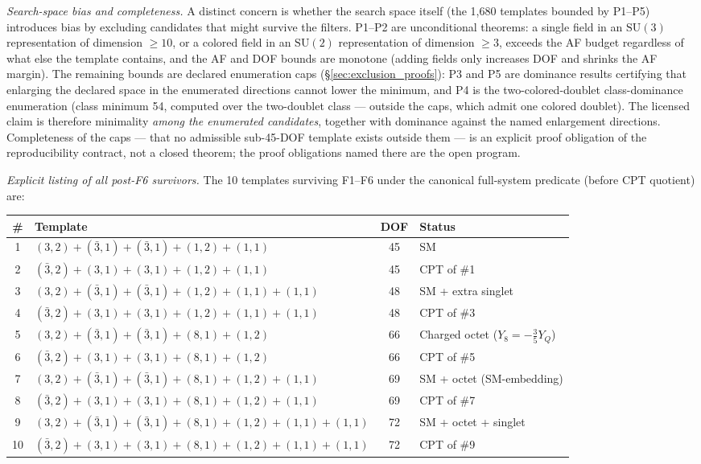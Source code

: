 \documentclass[11pt]{article}
\theoremstyle{definition}
\newcommand{\SU}{\mathrm{SU}}
\begin{document}
\smallskip\noindent\textit{Search-space bias and completeness.}\quad
A distinct concern is whether the search space itself (the 1{,}680
templates bounded by P1--P5) introduces bias by excluding candidates
that might survive the filters.  P1--P2 are unconditional theorems: a
single field in an $\SU(3)$ representation of dimension $\ge 10$, or a
colored field in an $\SU(2)$ representation of dimension $\ge 3$,
exceeds the AF budget regardless of what else the template contains,
and the AF and DOF bounds are monotone (adding fields only increases
DOF and shrinks the AF margin).  The remaining bounds are declared
enumeration caps (\S\ref{sec:exclusion_proofs}): P3 and P5 are
dominance results certifying that enlarging the declared space in the
enumerated directions cannot lower the minimum, and P4 is the
two-colored-doublet class-dominance enumeration (class minimum 54,
computed over the two-doublet class --- outside the caps, which admit
one colored doublet).  The licensed claim is
therefore minimality \emph{among the enumerated candidates}, together
with dominance against the named enlargement directions.  Completeness
of the caps --- that no admissible sub-45-DOF template exists outside
them --- is an explicit proof obligation of the reproducibility
contract, not a closed theorem; the proof obligations named there are
the open program.

\smallskip\noindent\textit{Explicit listing of all post-F6 survivors.}\quad
The 10 templates surviving F1--F6 under the canonical full-system
predicate (before CPT quotient) are:

\smallskip
\begin{center}\small
\renewcommand{\arraystretch}{1.15}
\begin{tabular}{@{}clcl@{}}
\toprule
\# & Template & DOF & Status \\
\midrule
1 & $(3,2) + (\bar{3},1) + (\bar{3},1) + (1,2) + (1,1)$ & 45 & SM \\
2 & $(\bar{3},2) + (3,1) + (3,1) + (1,2) + (1,1)$ & 45 & CPT of \#1 \\
3 & $(3,2) + (\bar{3},1) + (\bar{3},1) + (1,2) + (1,1) + (1,1)$ & 48 & SM + extra singlet \\
4 & $(\bar{3},2) + (3,1) + (3,1) + (1,2) + (1,1) + (1,1)$ & 48 & CPT of \#3 \\
5 & $(3,2) + (\bar{3},1) + (\bar{3},1) + (8,1) + (1,2)$ & 66 & Charged octet ($Y_8 = -\tfrac{3}{5}Y_Q$) \\
6 & $(\bar{3},2) + (3,1) + (3,1) + (8,1) + (1,2)$ & 66 & CPT of \#5 \\
7 & $(3,2) + (\bar{3},1) + (\bar{3},1) + (8,1) + (1,2) + (1,1)$ & 69 & SM + octet (SM-embedding) \\
8 & $(\bar{3},2) + (3,1) + (3,1) + (8,1) + (1,2) + (1,1)$ & 69 & CPT of \#7 \\
9 & $(3,2) + (\bar{3},1) + (\bar{3},1) + (8,1) + (1,2) + (1,1) + (1,1)$ & 72 & SM + octet + singlet \\
10 & $(\bar{3},2) + (3,1) + (3,1) + (8,1) + (1,2) + (1,1) + (1,1)$ & 72 & CPT of \#9 \\
\bottomrule
\end{tabular}
\end{center}
\end{document}
